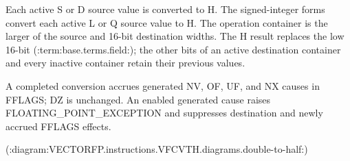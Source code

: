 Each active S or D source value is converted to H. The signed-integer forms
convert each active L or Q source value to H. The operation container is the
larger of the source and 16-bit destination widths. The H result replaces the
low 16-bit (:term:base.terms.field:); the other bits of an active destination container and every
inactive container retain their previous values.

A completed conversion accrues generated NV, OF, UF, and NX causes in FFLAGS;
DZ is unchanged. An enabled generated cause raises FLOATING\_POINT\_EXCEPTION and
suppresses destination and newly accrued FFLAGS effects.

(:diagram:VECTORFP.instructions.VFCVTH.diagrams.double-to-half:)
